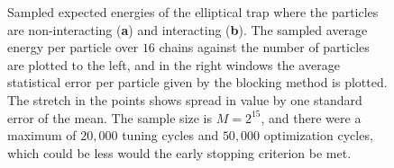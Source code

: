 \begin{figure}[!htb]
\centering
{}
\qquad
{}
\caption{Sampled expected energies of the elliptical trap where the particles are non-interacting (\textbf{a}) and interacting (\textbf{b}). The sampled average energy per particle over $16$ chains against the number of particles are plotted to the left, and in the right windows the average statistical error per particle given by the blocking method is plotted. The stretch in the points shows spread in value by one standard error of the mean. The sample size is $M=2^{15}$, and there were a maximum of $20,000$ tuning cycles and $50,000$ optimization cycles, which could be less would the early stopping criterion be met.}
\label{fig:elliptical_energies}
\end{figure}


